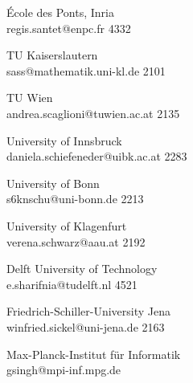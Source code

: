 \begin{multicols}{2}
 {\'{E}cole des Ponts, Inria\\}%
 {regis.santet@enpc.fr}%
 {4332} %
 {} %
 {} %
 {} %
 {} %

 {TU Kaiserslautern\\}%
 {sass@mathematik.uni-kl.de}%
 {2101} %
 {} %
 {} %
 {} %
 {} %

 {TU Wien\\}%
 {andrea.scaglioni@tuwien.ac.at}%
 {2135} %
 {} %
 {} %
 {} %
 {} %

 {University of Innsbruck\\}%
 {daniela.schiefeneder@uibk.ac.at}%
 {2283} %
 {} %
 {} %
 {} %
 {} %

 {University of Bonn\\}%
 {s6knschu@uni-bonn.de}%
 {2213} %
 {} %
 {} %
 {} %
 {} %

 {University of Klagenfurt\\}%
 {verena.schwarz@aau.at}%
 {2192} %
 {} %
 {} %
 {} %
 {} %

 {Delft University of Technology\\}%
 {e.sharifnia@tudelft.nl}%
 {4521} %
 {} %
 {} %
 {} %
 {} %

 {Friedrich-Schiller-University Jena\\}%
 {winfried.sickel@uni-jena.de}%
 {2163} %
 {} %
 {} %
 {} %
 {} %

 {Max-Planck-Institut f{\"u}r Informatik\\}%
 {gsingh@mpi-inf.mpg.de}%
 {} %
 {} %
 {} %
 {} %
 {} %


\end{multicols}
